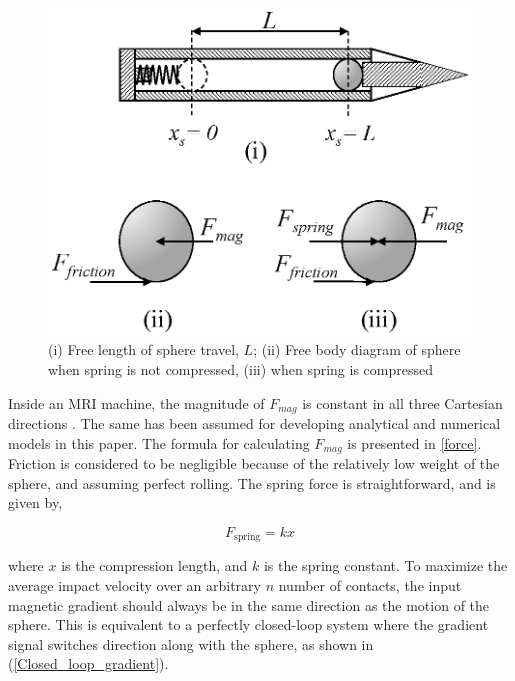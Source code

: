 \documentclass[letterpaper, 10 pt, conference]{ieeeconf}  %
\begin{document}
\begin{figure}
	\includegraphics[width=\linewidth]{FBD.eps}
	\caption{(i) Free length of sphere travel, $L$; (ii) Free body diagram of sphere when spring is not compressed, (iii) when spring is compressed}
	\label{FBD}
\end{figure}

Inside an MRI machine, the magnitude of $F_{mag}$ is constant in all three Cartesian directions \cite{CMR:CMR20163}. The same has been assumed for developing analytical and numerical models in this paper. The formula for calculating $F_{mag}$ is presented in  \cref{force}. Friction is considered to be negligible because of the relatively low weight of the sphere, and assuming perfect rolling. The spring force is straightforward, and is given by,

\begin{equation}
F_{\text{spring}}=k x
\label{spring_force}
\end{equation}

where $x$ is the compression length, and $k$ is the spring constant. To maximize the average impact velocity over an arbitrary $n$ number of contacts, the input magnetic gradient should always be in the same direction as the motion of the sphere. This is equivalent to a perfectly closed-loop system where the gradient signal switches direction along with the sphere, as shown in (\ref{Closed_loop_gradient}).
\end{document}

